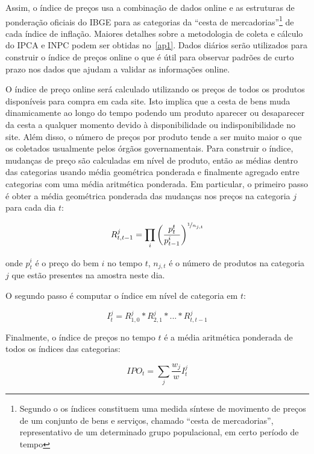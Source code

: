 \documentclass[twoside,a4paper,11pt]{report}
\begin{document}
Assim, o índice de preços usa a combinação de dados online e as estruturas de ponderação oficiais do IBGE para as categorias da “cesta de mercadorias”\footnote[1]{Segundo o \citet{ibgemetodos} os índices constituem uma medida síntese de movimento de preços de um conjunto de bens e serviços, chamado “cesta de mercadorias”, representativo de um determinado grupo populacional, em certo período de tempo} de cada índice de inflação. Maiores detalhes sobre a metodologia de coleta e cálculo do IPCA e INPC podem ser obtidas no~\ref{ap1}. Dados diários serão utilizados para construir o índice de preços online o que é útil para observar padrões de curto prazo nos dados que ajudam a validar as informações online. 
  
O índice de preço online será calculado utilizando os preços de todos os produtos disponíveis para compra em cada site. Isto implica que a cesta de bens muda dinamicamente ao longo do tempo podendo um produto aparecer ou desaparecer da cesta a qualquer momento devido à disponibilidade ou indisponibilidade no site. Além disso, o número de preços por produto tende a ser muito maior o que os coletados usualmente pelos órgãos governamentais. 
Para construir o índice, mudanças de preço são calculadas em nível de produto, então as médias dentro das categorias usando média geométrica ponderada e finalmente agregado entre categorias com uma média aritmética ponderada. Em particular, o primeiro passo é obter a média geométrica ponderada das mudanças nos preços na categoria $j$ para cada dia $t$:

\begin{equation}\label{eq1}
R_{t,t-1}^{j}=\prod_{i}\left(\frac{p_{t}^{t}}{p_{t-1}^{i}}\right)^{\nicefrac{1}{n_{j,t}}}
\end{equation}

\noindent onde $p_{t}^{i}$ é o preço do bem $i$ no tempo $t$, $n_{j,t}$ é o número de produtos na categoria $j$ que estão presentes na amostra neste dia. 

O segundo passo é computar o índice em nível de categoria em $t$:

\begin{equation}\label{eq2}
I_{t}^{j}=R_{1,0}^{j}\ast{R}_{2,1}^{j}\ast{...}\ast{R}_{t,t-1}^{j}
\end{equation}

Finalmente, o índice de preços no tempo $t$ é a média aritmética ponderada de todos os índices das categorias:

\begin{equation}\label{eq3}
IPO_{t}=\sum_{j}{\frac{w_{j}}{w}I_{t}^{j}} 
\end{equation}
\end{document}
